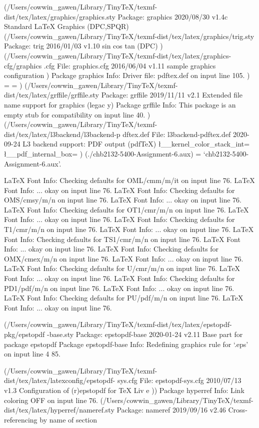 (/Users/cowwin_gawen/Library/TinyTeX/texmf-dist/tex/latex/graphics/graphics.sty
Package: graphics 2020/08/30 v1.4c Standard LaTeX Graphics (DPC,SPQR)
(/Users/cowwin_gawen/Library/TinyTeX/texmf-dist/tex/latex/graphics/trig.sty
Package: trig 2016/01/03 v1.10 sin cos tan (DPC)
)
(/Users/cowwin_gawen/Library/TinyTeX/texmf-dist/tex/latex/graphics-cfg/graphics
.cfg
File: graphics.cfg 2016/06/04 v1.11 sample graphics configuration
)
Package graphics Info: Driver file: pdftex.def on input line 105.
)
\Gin@req@height=
\Gin@req@width=
) (/Users/cowwin_gawen/Library/TinyTeX/texmf-dist/tex/latex/grffile/grffile.sty
Package: grffile 2019/11/11 v2.1 Extended file name support for graphics (legac
y)
Package grffile Info: This package is an empty stub for compatibility on input 
line 40.
)
(/Users/cowwin_gawen/Library/TinyTeX/texmf-dist/tex/latex/l3backend/l3backend-p
dftex.def
File: l3backend-pdftex.def 2020-09-24 L3 backend support: PDF output (pdfTeX)
\l__kernel_color_stack_int=
\l__pdf_internal_box=
) (./chb2132-5400-Assignment-6.aux)
 = `chb2132-5400-Assignment-6.aux'.

LaTeX Font Info:    Checking defaults for OML/cmm/m/it on input line 76.
LaTeX Font Info:    ... okay on input line 76.
LaTeX Font Info:    Checking defaults for OMS/cmsy/m/n on input line 76.
LaTeX Font Info:    ... okay on input line 76.
LaTeX Font Info:    Checking defaults for OT1/cmr/m/n on input line 76.
LaTeX Font Info:    ... okay on input line 76.
LaTeX Font Info:    Checking defaults for T1/cmr/m/n on input line 76.
LaTeX Font Info:    ... okay on input line 76.
LaTeX Font Info:    Checking defaults for TS1/cmr/m/n on input line 76.
LaTeX Font Info:    ... okay on input line 76.
LaTeX Font Info:    Checking defaults for OMX/cmex/m/n on input line 76.
LaTeX Font Info:    ... okay on input line 76.
LaTeX Font Info:    Checking defaults for U/cmr/m/n on input line 76.
LaTeX Font Info:    ... okay on input line 76.
LaTeX Font Info:    Checking defaults for PD1/pdf/m/n on input line 76.
LaTeX Font Info:    ... okay on input line 76.
LaTeX Font Info:    Checking defaults for PU/pdf/m/n on input line 76.
LaTeX Font Info:    ... okay on input line 76.

(/Users/cowwin_gawen/Library/TinyTeX/texmf-dist/tex/latex/epstopdf-pkg/epstopdf
-base.sty
Package: epstopdf-base 2020-01-24 v2.11 Base part for package epstopdf
Package epstopdf-base Info: Redefining graphics rule for `.eps' on input line 4
85.

(/Users/cowwin_gawen/Library/TinyTeX/texmf-dist/tex/latex/latexconfig/epstopdf-
sys.cfg
File: epstopdf-sys.cfg 2010/07/13 v1.3 Configuration of (r)epstopdf for TeX Liv
e
))
Package hyperref Info: Link coloring OFF on input line 76.
(/Users/cowwin_gawen/Library/TinyTeX/texmf-dist/tex/latex/hyperref/nameref.sty
Package: nameref 2019/09/16 v2.46 Cross-referencing by name of section

